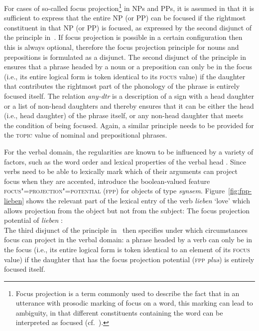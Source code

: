 \documentclass[output=paper
	        ,collection
	        ,collectionchapter
 	        ,biblatex
                ,babelshorthands
                ,newtxmath
                ,draftmode
                ,colorlinks, citecolor=brown
]{langscibook}
\begin{document}
For cases of so-called focus projection\footnote{Focus projection is a term commonly used to describe the fact that in an utterance with prosodic marking of focus on a word, this marking can lead to ambiguity, in that different constituents containing the word can be interpreted as focused (cf.\  \citealt{Gussenhoven83-u,Selkirk95a-u}).} in NPs and PPs, it is assumed
in \citet[169]{deKuthy2002a} that it is sufficient to express that the
entire NP (or PP) can be focused if the rightmost constituent in that
NP (or PP) is focused, as expressed by the second disjunct of the
principle in~.  If focus projection is
possible in a certain configuration then this is always optional,
therefore the focus projection principle for nouns and prepositions is
formulated as a disjunct. The second disjunct of the principle
in~ ensures that a phrase headed by a noun
or a preposition can only be in the focus (i.e., its entire logical
form is token identical to its \textsc{focus} value) if the daughter
that contributes the rightmost part of the phonology of the phrase is
entirely focused itself. The relation \textit{any-dtr} is a description of a sign with a head daughter or a list of non-head daughters and thereby
ensures that it can be either the head (i.e., head daughter) of the
phrase itself, or any non-head daughter that meets the
condition of being focused. Again, a similar principle needs to be provided for the
\textsc{topic} value of nominal and prepositional phrases.

For the verbal domain, the regularities are known to be influenced by
a variety of factors, such as the word order and lexical properties of
the verbal head \citep[cf., e.g., ][]{vSU86a}.  Since verbs
need to be able to lexically mark which of their arguments can project
focus when they are accented, \cite{dKM2003a} introduce the boolean-valued feature
\textsc{focus"=projection"=potential (fpp)} for objects of type
\textit{synsem}.  Figure~\ref{fig:fpp-lieben} shows the relevant part
of the lexical entry of the verb \textit{lieben} `love' which allows
projection from the object but not from the subject:
\ea
The focus projection potential of \textit{lieben} \citep{dKM2003a}:\\
\label{fig:fpp-lieben}
\z
The third disjunct of the principle in~ then specifies under which circumstances
focus can project in the verbal domain: a phrase headed by a verb can
only be in the focus (i.e., its entire logical form is token identical
to an element of its \textsc{focus} value) if the daughter that has the focus
projection potential (\textsc{fpp} \textit{plus}) is entirely focused
itself.
\end{document}
